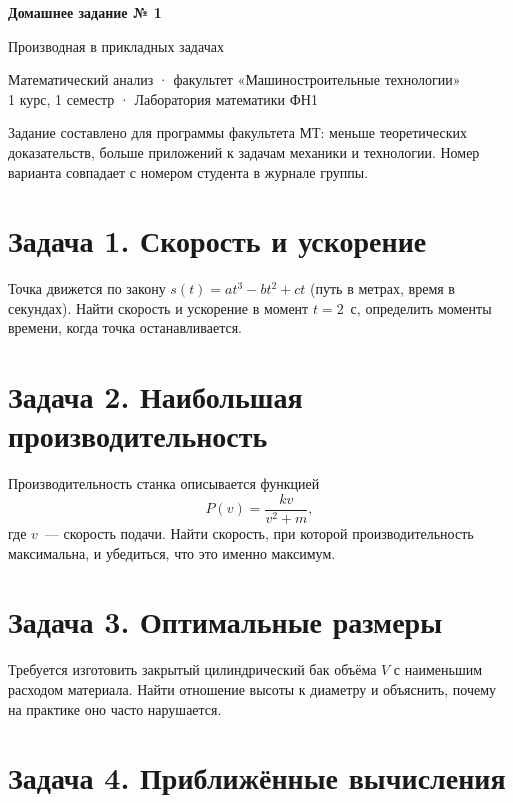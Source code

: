 \documentclass[12pt, a4paper]{article}
\begin{document}
\begin{center}
  {\large\bfseries Домашнее задание № 1}

  \vspace{0.3em}
  {\large Производная в прикладных задачах}

  \vspace{0.5em}
  {\small Математический анализ · факультет «Машиностроительные технологии»\\
  1 курс, 1 семестр · Лаборатория математики ФН1}
\end{center}

\vspace{1em}

\noindent
Задание составлено для программы факультета МТ: меньше теоретических
доказательств, больше приложений к задачам механики и технологии.
Номер варианта совпадает с номером студента в журнале группы.

\section*{Задача 1. Скорость и ускорение}

Точка движется по закону $s(t) = a t^3 - b t^2 + c t$ (путь в метрах,
время в секундах). Найти скорость и ускорение в момент $t = 2$~с,
определить моменты времени, когда точка останавливается.

\section*{Задача 2. Наибольшая производительность}

Производительность станка описывается функцией
\[
P(v) = \frac{k v}{v^2 + m},
\]
где $v$~--- скорость подачи. Найти скорость, при которой производительность
максимальна, и убедиться, что это именно максимум.

\section*{Задача 3. Оптимальные размеры}

Требуется изготовить закрытый цилиндрический бак объёма $V$ с наименьшим
расходом материала. Найти отношение высоты к диаметру и объяснить,
почему на практике оно часто нарушается.

\section*{Задача 4. Приближённые вычисления}
\end{document}
